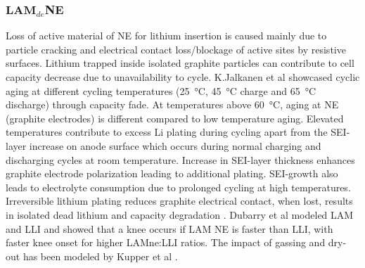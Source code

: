 \documentclass{article}
\newcommand{\pbox}[1]{{
\fbox{
\parbox{0.8\textwidth}{  \fbox{$\triangleright$\textcolor{blue}{\textbf{From Peter}:}} 
#1
}}}}
\begin{document}
\subsubsection{$\textbf{LAM}_{de}$NE}

\pbox{READY FOR EDITING}

Loss of active material of NE for lithium insertion is caused mainly due to particle cracking and electrical contact loss/blockage of active sites by resistive surfaces. Lithium trapped inside isolated graphite particles can contribute to cell capacity decrease due to unavailability to cycle. K.Jalkanen et al \cite{jalkanen_cycle_2015} showcased cyclic aging at different cycling temperatures (\SI{25}{\celsius}, \SI{45}{\celsius} charge and \SI{65}{\celsius} discharge) through capacity fade. At temperatures above \SI{60}{\celsius}, aging at NE (graphite electrodes) is different compared to low temperature aging. Elevated temperatures contribute to excess Li plating during  cycling apart from the SEI-layer increase on anode surface which occurs during normal charging and discharging cycles at room temperature. Increase in SEI-layer thickness enhances graphite electrode polarization leading to additional plating. SEI-growth also leads to electrolyte consumption due to prolonged cycling at high temperatures. Irreversible lithium plating reduces graphite electrical contact, when lost, results in isolated dead lithium and capacity degradation \cite{petzl_lithium_2015}.  
Dubarry et al \cite{dubarry_durability_2018} modeled LAM and LLI and showed that a knee occurs if LAM NE is faster than LLI, with faster knee onset for higher LAMne:LLI ratios. The impact of gassing and dry-out has been modeled by Kupper et al \cite{kupper_end--life_2018}.
\end{document}
